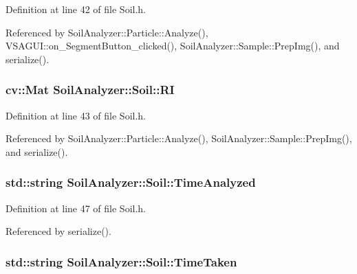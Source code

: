 Definition at line 42 of file Soil.\+h.



Referenced by Soil\+Analyzer\+::\+Particle\+::\+Analyze(), V\+S\+A\+G\+U\+I\+::on\+\_\+\+Segment\+Button\+\_\+clicked(), Soil\+Analyzer\+::\+Sample\+::\+Prep\+Img(), and serialize().

\hypertarget{class_soil_analyzer_1_1_soil_abe8693b60a3d88433ffb8255b8d260c3}{}
\subsubsection[{R\+I}]{\setlength{\rightskip}{0pt plus 5cm}cv\+::\+Mat Soil\+Analyzer\+::\+Soil\+::\+R\+I}\label{class_soil_analyzer_1_1_soil_abe8693b60a3d88433ffb8255b8d260c3}


Definition at line 43 of file Soil.\+h.



Referenced by Soil\+Analyzer\+::\+Particle\+::\+Analyze(), Soil\+Analyzer\+::\+Sample\+::\+Prep\+Img(), and serialize().

\hypertarget{class_soil_analyzer_1_1_soil_a3c1c025be53aae3cbe858b7a7936d8dd}{}
\subsubsection[{Time\+Analyzed}]{\setlength{\rightskip}{0pt plus 5cm}std\+::string Soil\+Analyzer\+::\+Soil\+::\+Time\+Analyzed}\label{class_soil_analyzer_1_1_soil_a3c1c025be53aae3cbe858b7a7936d8dd}


Definition at line 47 of file Soil.\+h.



Referenced by serialize().

\hypertarget{class_soil_analyzer_1_1_soil_ae459914e6c463e97d1761d791f653b2d}{}
\subsubsection[{Time\+Taken}]{\setlength{\rightskip}{0pt plus 5cm}std\+::string Soil\+Analyzer\+::\+Soil\+::\+Time\+Taken}\label{class_soil_analyzer_1_1_soil_ae459914e6c463e97d1761d791f653b2d}


